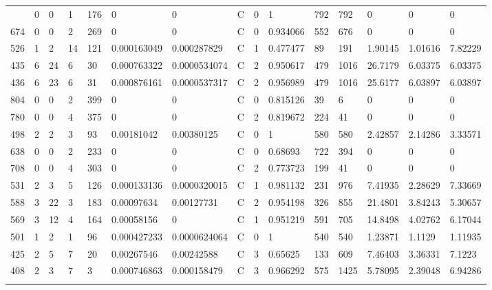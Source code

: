 \begin{latin}
\begin{longtable}{lllllllllllllll}
\begin{comment}
	581 & 0  & 0   & 1  & 176 & 0              & 0              & C & 0  & 1        & 792  & 792  & 0       & 0       & 0       \\
	674 & 0  & 0   & 2  & 269 & 0              & 0              & C & 0  & 0.934066 & 552  & 676  & 0       & 0       & 0       \\
	526 & 1  & 2   & 14 & 121 & 0.000163049    & 0.000287829    & C & 1  & 0.477477 & 89   & 191  & 1.90145 & 1.01616 & 7.82229 \\
	435 & 6  & 24  & 6  & 30  & 0.000763322    & 0.0000534074   & C & 2  & 0.950617 & 479  & 1016 & 26.7179 & 6.03375 & 6.03375 \\
	436 & 6  & 23  & 6  & 31  & 0.000876161    & 0.0000537317   & C & 2  & 0.956989 & 479  & 1016 & 25.6177 & 6.03897 & 6.03897 \\
	804 & 0  & 0   & 2  & 399 & 0              & 0              & C & 0  & 0.815126 & 39   & 6    & 0       & 0       & 0       \\
	780 & 0  & 0   & 4  & 375 & 0              & 0              & C & 2  & 0.819672 & 224  & 41   & 0       & 0       & 0       \\
	498 & 2  & 2   & 3  & 93  & 0.00181042     & 0.00380125     & C & 0  & 1        & 580  & 580  & 2.42857 & 2.14286 & 3.33571 \\
	638 & 0  & 0   & 2  & 233 & 0              & 0              & C & 0  & 0.68693  & 722  & 394  & 0       & 0       & 0       \\
	708 & 0  & 0   & 4  & 303 & 0              & 0              & C & 2  & 0.773723 & 199  & 41   & 0       & 0       & 0       \\
	531 & 2  & 3   & 5  & 126 & 0.000133136    & 0.0000320015   & C & 1  & 0.981132 & 231  & 976  & 7.41935 & 2.28629 & 7.33669 \\
	588 & 3  & 22  & 3  & 183 & 0.00097634     & 0.00127731     & C & 2  & 0.954198 & 326  & 855  & 21.4801 & 3.84243 & 5.30657 \\
	569 & 3  & 12  & 4  & 164 & 0.00058156     & 0              & C & 1  & 0.951219 & 591  & 705  & 14.8498 & 4.02762 & 6.17044 \\
	501 & 1  & 2   & 1  & 96  & 0.000427233    & 0.0000624064   & C & 0  & 1        & 540  & 540  & 1.23871 & 1.1129  & 1.11935 \\
	425 & 2  & 5   & 7  & 20  & 0.00267546     & 0.00242588     & C & 3  & 0.65625  & 133  & 609  & 7.46403 & 3.36331 & 7.1223  \\
	408 & 2  & 3   & 7  & 3   & 0.000746863    & 0.000158479    & C & 3  & 0.966292 & 575  & 1425 & 5.78095 & 2.39048 & 6.94286 \\

\end{comment}
\end{longtable}
\end{latin}
